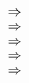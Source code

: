 \documentclass{article}
\begin{document}
	\begin{equation}
		\vcenter{\hbox{}} \,\, \Rightarrow \,\,
		\vcenter{\hbox{}}
	\end{equation}
	\begin{equation}
		\vcenter{\hbox{}} \,\, \Rightarrow \,\,
		\vcenter{\hbox{}}
	\end{equation}
	\begin{equation}
		\vcenter{\hbox{}} \,\, \Rightarrow \,\,
		\vcenter{\hbox{}}
	\end{equation}
	\begin{equation}
		\vcenter{\hbox{}} \,\, \Rightarrow \,\,
		\vcenter{\hbox{}}
	\end{equation}
	\begin{equation}
		\vcenter{\hbox{}} \,\, \Rightarrow \,\,
		\vcenter{\hbox{}}
	\end{equation}
\end{document}
